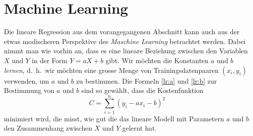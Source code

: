 %
%
%
\section{Machine Learning}
Die lineare Regression aus dem vorangegangenen Abschnitt kann auch aus
der etwas modischeren Perspektive des {\em Maschine Learning} 
betrachtet werden.
Dabei nimmt man wie vorhin an, dass es eine lineare Beziehung zwischen den
Variablen $X$ und $Y$ in der Form
$Y=aX+b$ gibt.
Wir möchten die Konstanten $a$ und $b$ {\em lernen}, d.~h.~wir möchten
eine grosse Menge von Trainingsdatenpaaren $(x_i, y_i)$ verwenden,
um $a$ und $b$ zu bestimmen.
Die Formeln \eqref{lr:a} und \eqref{lr:b} zur Bestimmung von $a$ und $b$
sind so gewählt, dass die Kostenfunktion
\[
C
=
\sum_{i=1}^n (y_i-ax_i-b)^2
\]
minimiert wird,
die misst, wie gut die das lineare Modell mit Parametern $a$ und $b$
den Zusammenhang zwischen $X$ und $Y$ gelernt hat.



